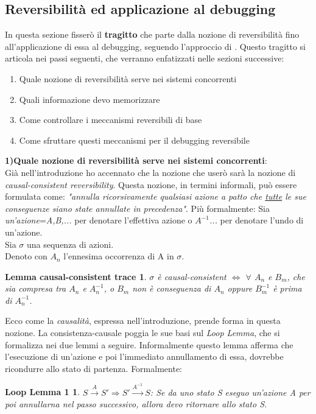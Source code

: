 \documentclass[background.tex]{subfiles}
\begin{document}
\subsection{Reversibilità ed applicazione al debugging}
In questa sezione fisserò il \textbf{tragitto} che parte dalla nozione di reversibilità fino all'applicazione di essa al debugging, seguendo l'approccio di \cite{lanese18}.
Questo tragitto si articola nei passi seguenti, che verranno enfatizzati nelle sezioni successive:
\begin{enumerate}
	\item Quale nozione di reversibilità serve nei sistemi concorrenti
	\item Quali informazione devo memorizzare
	\item Come controllare i meccanismi reversibili di base
	\item Come sfruttare questi meccanismi per il debugging reversibile
\end{enumerate}
\textbf{1)Quale nozione di reversibilità serve nei sistemi concorrenti}:\\
Già nell'introduzione ho accennato che la nozione che userò sarà la nozione di \textit{causal-consistent reversibility}. Questa nozione, in termini informali, può essere formulata come:
\textit{"annulla ricorsivamente qualsiasi azione a patto che \underline{tutte} le sue conseguenze siano state annullate in precedenza"}.
Più formalmente:
Sia \textit{un'azione}=\textit{A,B,...} per denotare l'effettiva azione o \textit{$A^{-1}$...} per denotare l'undo di un'azione.\\
Sia $\sigma$ una sequenza di azioni.\\
Denoto con $A_{n}$ l'ennesima occorrenza di A in $\sigma$.
\newtheorem*{CausalTrace}{Lemma causal-consistent trace}
\begin{CausalTrace}
$\sigma$ è causal-consistent $\iff$ $\forall$ $A_{n}$ e $B_{m}$, che sia compresa tra $A_{n}$ e $A_{n}^{-1}$, o $B_{m}$ non è conseguenza di $A_{n}$ oppure $B_{m}^{-1}$ è prima di $A_{n}^{-1}$.
\end{CausalTrace}
Ecco come la \textit{causalità}, espressa nell'introduzione, prende forma in questa nozione. La consistenza-causale poggia le sue basi sul \textit{Loop Lemma}, che si formalizza nei due lemmi a seguire.
Informalmente questo lemma afferma che l'esecuzione di un'azione e poi l'immediato annullamento di essa, dovrebbe ricondurre allo stato di partenza.
Formalmente:
\newtheorem*{ax1}{Loop Lemma 1}
	\begin{ax1}
 		$\displaystyle S\xrightarrow{A}S' \Rightarrow S'\xrightarrow{A^{-1}}S$: Se da uno stato S eseguo un'azione A per poi annullarna nel passo successivo, allora devo ritornare allo stato S.
	\end{ax1}
\end{document}
